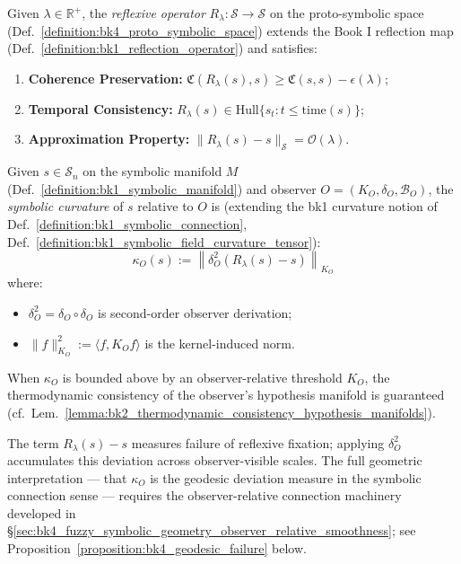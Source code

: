 \begin{definition}
\label{definition:bk4_reflexive_operator}
Given $\lambda \in \mathbb{R}^+$, the \emph{reflexive operator} $R_\lambda : \mathcal{S} \to \mathcal{S}$ on the proto-symbolic space (Def.~\ref{definition:bk4_proto_symbolic_space}) extends the Book I reflection map (Def.~\ref{definition:bk1_reflection_operator}) and satisfies:
\begin{enumerate}
    \item \textbf{Coherence Preservation:} $\mathfrak{C}(R_\lambda(s), s) \geq \mathfrak{C}(s, s) - \epsilon(\lambda)$;
    \item \textbf{Temporal Consistency:} $R_\lambda(s) \in \text{Hull}\{s_t : t \leq \mathrm{time}(s)\}$;
    \item \textbf{Approximation Property:} $\| R_\lambda(s) - s \|_{\mathcal{S}} = \mathcal{O}(\lambda)$.
\end{enumerate}
\end{definition}

\begin{definition}
\label{definition:bk4_symbolic_curvature}
Given $s \in \mathcal{S}_n$ on the symbolic manifold $M$ (Def.~\ref{definition:bk1_symbolic_manifold}) and observer $O = (K_O, \delta_O, \mathcal{B}_O)$, the \emph{symbolic curvature} of $s$ relative to $O$ is (extending the bk1 curvature notion of Def.~\ref{definition:bk1_symbolic_connection}, Def.~\ref{definition:bk1_symbolic_field_curvature_tensor}):
\[
\kappa_O(s) := \left\| \delta_O^2(R_\lambda(s) - s) \right\|_{K_O}
\]
where:
\begin{itemize}
    \item $\delta_O^2 = \delta_O \circ \delta_O$ is second-order observer derivation;
    \item $\|f\|_{K_O}^2 := \langle f, K_O f \rangle$ is the kernel-induced norm.
\end{itemize}
When $\kappa_O$ is bounded above by an observer-relative threshold $K_O$, the thermodynamic consistency of the observer's hypothesis manifold is guaranteed (cf.~Lem.~\ref{lemma:bk2_thermodynamic_consistency_hypothesis_manifolds}).
\end{definition}

\begin{remark}
The term $R_\lambda(s) - s$ measures failure of reflexive fixation; applying $\delta_O^2$
accumulates this deviation across observer-visible scales. The full geometric interpretation
--- that $\kappa_O$ is the geodesic deviation measure in the symbolic connection sense ---
requires the observer-relative connection machinery developed in
\S\ref{sec:bk4_fuzzy_symbolic_geometry_observer_relative_smoothness};
see Proposition~\ref{proposition:bk4_geodesic_failure} below.
\end{remark}

